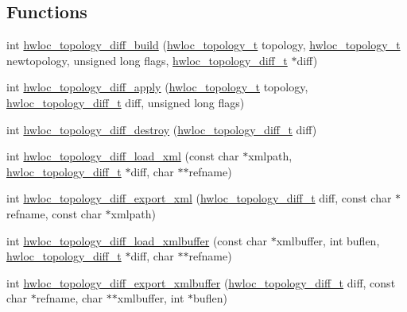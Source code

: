 \subsection*{Functions}
\begin{DoxyCompactItemize}
\item 
int \hyperlink{a00225_ga8a1754f69fbb31364ea3ea2c39827c9f}{hwloc\+\_\+topology\+\_\+diff\+\_\+build} (\hyperlink{a00186_ga9d1e76ee15a7dee158b786c30b6a6e38}{hwloc\+\_\+topology\+\_\+t} topology, \hyperlink{a00186_ga9d1e76ee15a7dee158b786c30b6a6e38}{hwloc\+\_\+topology\+\_\+t} newtopology, unsigned long flags, \hyperlink{a00225_ga2cf1b17332fe5d95f2198f6340cfd288}{hwloc\+\_\+topology\+\_\+diff\+\_\+t} $\ast$diff)
\item 
int \hyperlink{a00225_gae7b350d7e7478a4c6047b08aa6544f40}{hwloc\+\_\+topology\+\_\+diff\+\_\+apply} (\hyperlink{a00186_ga9d1e76ee15a7dee158b786c30b6a6e38}{hwloc\+\_\+topology\+\_\+t} topology, \hyperlink{a00225_ga2cf1b17332fe5d95f2198f6340cfd288}{hwloc\+\_\+topology\+\_\+diff\+\_\+t} diff, unsigned long flags)
\item 
int \hyperlink{a00225_ga5dcff18f80583ac6505a94ba2877fd1b}{hwloc\+\_\+topology\+\_\+diff\+\_\+destroy} (\hyperlink{a00225_ga2cf1b17332fe5d95f2198f6340cfd288}{hwloc\+\_\+topology\+\_\+diff\+\_\+t} diff)
\item 
int \hyperlink{a00225_ga2cd902ce8766e90d4f2523a8e87640e9}{hwloc\+\_\+topology\+\_\+diff\+\_\+load\+\_\+xml} (const char $\ast$xmlpath, \hyperlink{a00225_ga2cf1b17332fe5d95f2198f6340cfd288}{hwloc\+\_\+topology\+\_\+diff\+\_\+t} $\ast$diff, char $\ast$$\ast$refname)
\item 
int \hyperlink{a00225_ga8a14dd7d01efbdd97af7fe85e8b84b20}{hwloc\+\_\+topology\+\_\+diff\+\_\+export\+\_\+xml} (\hyperlink{a00225_ga2cf1b17332fe5d95f2198f6340cfd288}{hwloc\+\_\+topology\+\_\+diff\+\_\+t} diff, const char $\ast$refname, const char $\ast$xmlpath)
\item 
int \hyperlink{a00225_gad693810a5c51628529b9dd56f040fb81}{hwloc\+\_\+topology\+\_\+diff\+\_\+load\+\_\+xmlbuffer} (const char $\ast$xmlbuffer, int buflen, \hyperlink{a00225_ga2cf1b17332fe5d95f2198f6340cfd288}{hwloc\+\_\+topology\+\_\+diff\+\_\+t} $\ast$diff, char $\ast$$\ast$refname)
\item 
int \hyperlink{a00225_gaa2f0918df60c1c4a0bef9411f7d92a13}{hwloc\+\_\+topology\+\_\+diff\+\_\+export\+\_\+xmlbuffer} (\hyperlink{a00225_ga2cf1b17332fe5d95f2198f6340cfd288}{hwloc\+\_\+topology\+\_\+diff\+\_\+t} diff, const char $\ast$refname, char $\ast$$\ast$xmlbuffer, int $\ast$buflen)
\end{DoxyCompactItemize}


